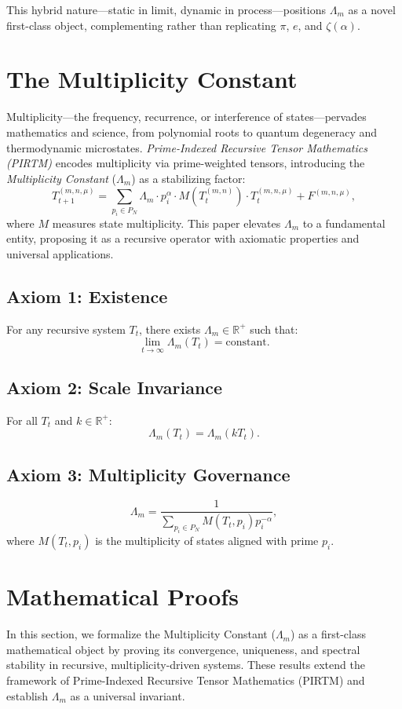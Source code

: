 \documentclass{article}
\theoremstyle{plain}
\begin{document}
This hybrid nature—static in limit, dynamic in process—positions \(\Lambda_m\) as a novel first-class object, complementing rather than replicating \(\pi\), \(e\), and \(\zeta(\alpha)\).

\section{ The Multiplicity Constant}
Multiplicity---the frequency, recurrence, or interference of states---pervades mathematics and science, from polynomial roots to quantum degeneracy and thermodynamic microstates. \textit{Prime-Indexed Recursive Tensor Mathematics (PIRTM)} encodes multiplicity via prime-weighted tensors, introducing the \textit{Multiplicity Constant} ($\Lambda_m$) as a stabilizing factor:
\[
T_{t+1}^{(m, n, \mu)} = \sum_{p_i \in P_N} \Lambda_m \cdot p_i^\alpha \cdot M(T_t^{(m, n)}) \cdot T_t^{(m, n, \mu)} + F^{(m, n, \mu)},
\]
where $M$ measures state multiplicity. This paper elevates $\Lambda_m$ to a fundamental entity, proposing it as a recursive operator with axiomatic properties and universal applications.

\subsection{Axiom 1: Existence}
For any recursive system $T_t$, there exists $\Lambda_m \in \mathbb{R}^+$ such that:
\[
\lim_{t \to \infty} \Lambda_m(T_t) = \text{constant}.
\]

\subsection{Axiom 2: Scale Invariance}
For all $T_t$ and $k \in \mathbb{R}^+$:
\[
\Lambda_m(T_t) = \Lambda_m(k T_t).
\]

\subsection{Axiom 3: Multiplicity Governance}
\[
\Lambda_m = \frac{1}{\sum_{p_i \in P_N} M(T_t, p_i) p_i^{-\alpha}},
\]
where $M(T_t, p_i)$ is the multiplicity of states aligned with prime $p_i$.


\section{Mathematical Proofs}
In this section, we formalize the Multiplicity Constant (\(\Lambda_m\)) as a first-class mathematical object by proving its convergence, uniqueness, and spectral stability in recursive, multiplicity-driven systems. These results extend the framework of Prime-Indexed Recursive Tensor Mathematics (PIRTM) and establish \(\Lambda_m\) as a universal invariant.
\end{document}
